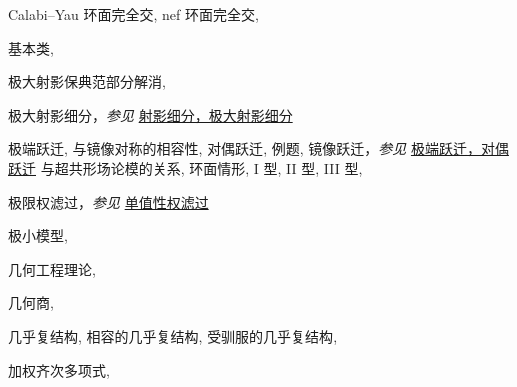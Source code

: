 \begin{theindex}
\subitem \leavevmode\hypertarget{idx:1348}{Calabi--Yau 环面完全交},\enspace{}
\subitem \leavevmode\hypertarget{idx:1349}{nef 环面完全交},\enspace{}
\indexspace
\item \leavevmode\hypertarget{idx:0347}{基本类},\enspace{}
\indexspace
\item \leavevmode\hypertarget{idx:0763}{极大射影保典范部分解消},\enspace{}
\indexspace
\item \leavevmode\hypertarget{idx:0764}{极大射影细分}，\textit{参见} \hyperlink{idx:1096}{射影细分，极大射影细分}
\indexspace
\item \leavevmode\hypertarget{idx:0285}{极端跃迁},\enspace{}
\subitem \leavevmode\hypertarget{idx:0286}{与镜像对称的相容性},\enspace{}
\subitem \leavevmode\hypertarget{idx:0287}{对偶跃迁},\enspace{}
\subitem \leavevmode\hypertarget{idx:0288}{例题},\enspace{}
\subitem \leavevmode\hypertarget{idx:0289}{镜像跃迁}，\textit{参见} \hyperlink{idx:0287}{极端跃迁，对偶跃迁}
\subitem \leavevmode\hypertarget{idx:0290}{与超共形场论模的关系},\enspace{}
\subitem \leavevmode\hypertarget{idx:0291}{环面情形},\enspace{}
\subitem \leavevmode\hypertarget{idx:0292}{I 型},\enspace{}
\subitem \leavevmode\hypertarget{idx:0293}{II 型},\enspace{}
\subitem \leavevmode\hypertarget{idx:0294}{III 型},\enspace{}
\indexspace
\item \leavevmode\hypertarget{idx:0716}{极限权滤过}，\textit{参见} \hyperlink{idx:0907}{单值性权滤过}
\indexspace
\item \leavevmode\hypertarget{idx:0784}{极小模型},\enspace{}
\indexspace
\item \leavevmode\hypertarget{idx:0379}{几何工程理论},\enspace{}
\indexspace
\item \leavevmode\hypertarget{idx:0378}{几何商},\enspace{}
\indexspace
\item \leavevmode\hypertarget{idx:0046}{几乎复结构},\enspace{}
\subitem \leavevmode\hypertarget{idx:0047}{相容的几乎复结构},\enspace{}
\subitem \leavevmode\hypertarget{idx:0048}{受驯服的几乎复结构},\enspace{}
\indexspace
\item \leavevmode\hypertarget{idx:1431}{加权齐次多项式},\enspace{}

\end{theindex}
